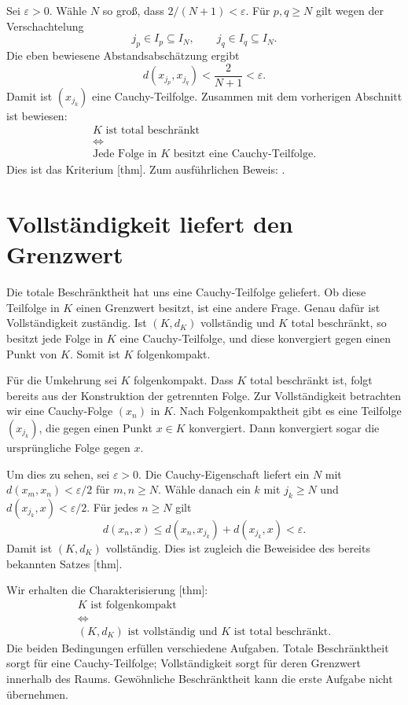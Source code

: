Sei \(\varepsilon>0\). Wähle \(N\) so groß, dass
\(2/(N+1)<\varepsilon\). Für \(p,q\geq N\) gilt wegen der
Verschachtelung
\[
 j_p\in I_p\subseteq I_N,
 \qquad j_q\in I_q\subseteq I_N.
\]
Die eben bewiesene Abstandsabschätzung ergibt
\[
 d(x_{j_p},x_{j_q})<\frac2{N+1}<\varepsilon.
\]
Damit ist \((x_{j_k})\) eine Cauchy-Teilfolge. Zusammen mit dem
vorherigen Abschnitt ist bewiesen:
\[
 \boxed{\begin{gathered}
 K\text{ ist total beschränkt}\\[-.2em]
 \Longleftrightarrow\\[-.2em]
 \text{Jede Folge in \(K\) besitzt eine Cauchy-Teilfolge.}
 \end{gathered}}
\]
Dies ist das Kriterium
[thm].
Zum ausführlichen Beweis:
.

\section*{Vollständigkeit liefert den Grenzwert}

Die totale Beschränktheit hat uns eine Cauchy-Teilfolge geliefert.
Ob diese Teilfolge in \(K\) einen Grenzwert besitzt, ist eine andere
Frage. Genau dafür ist Vollständigkeit zuständig. Ist \((K,d_K)\)
vollständig und \(K\) total beschränkt, so besitzt jede Folge in
\(K\) eine Cauchy-Teilfolge, und diese konvergiert gegen einen
Punkt von \(K\). Somit ist \(K\) folgenkompakt.

Für die Umkehrung sei \(K\) folgenkompakt. Dass \(K\) total
beschränkt ist, folgt bereits aus der Konstruktion der getrennten
Folge. Zur Vollständigkeit betrachten wir eine Cauchy-Folge
\((x_n)\) in \(K\). Nach Folgenkompaktheit gibt es eine Teilfolge
\((x_{j_k})\), die gegen einen Punkt \(x\in K\) konvergiert.
Dann konvergiert sogar die ursprüngliche Folge gegen \(x\).

Um dies zu sehen, sei \(\varepsilon>0\). Die Cauchy-Eigenschaft
liefert ein \(N\) mit
\(d(x_m,x_n)<\varepsilon/2\) für \(m,n\geq N\). Wähle
danach ein \(k\) mit \(j_k\geq N\) und
\(d(x_{j_k},x)<\varepsilon/2\). Für jedes \(n\geq N\) gilt
\[
 d(x_n,x)\leq d(x_n,x_{j_k})+d(x_{j_k},x)<\varepsilon.
\]
Damit ist \((K,d_K)\) vollständig. Dies ist zugleich die
Beweisidee des bereits bekannten Satzes
[thm].

Wir erhalten die Charakterisierung
[thm]:
\[
 \boxed{\begin{gathered}
 K\text{ ist folgenkompakt}\\[-.2em]
 \Longleftrightarrow\\[-.2em]
 (K,d_K)\text{ ist vollständig und }K\text{ ist total beschränkt}.
 \end{gathered}}
\]
Die beiden Bedingungen erfüllen verschiedene Aufgaben. Totale
Beschränktheit sorgt für eine Cauchy-Teilfolge; Vollständigkeit
sorgt für deren Grenzwert innerhalb des Raums. Gewöhnliche
Beschränktheit kann die erste Aufgabe nicht übernehmen.

